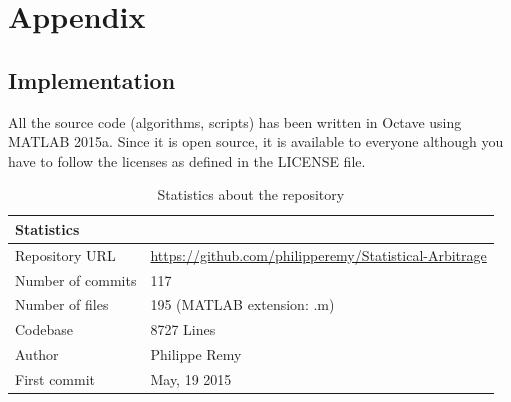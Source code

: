 \documentclass[11pt,a4,twosided,singlespacing,titlepagenumber=on]{scrreprt}
\numberwithin{equation}{chapter} %
\theoremstyle{remark}
\begin{document}

\cleardoublepage
{}
{} %




\chapter{Appendix}

\section{Implementation}
\label{app:implementation}
All the source code (algorithms, scripts) has been written in Octave using MATLAB 2015a. Since it is open source, it is available to everyone although you have to follow the licenses as defined in the LICENSE file.

\begin{table}[H]
\centering
\begin{tabular}{ll}
\hline
\multicolumn{1}{|l}{Statistics}     & \multicolumn{1}{l|}{} \\ \hline
Repository URL 					   &  \url{https://github.com/philipperemy/Statistical-Arbitrage} \\
Number of commits   			 &  117 \\
Number of files   				 &  195 (MATLAB extension: .m) \\
Codebase   				         &  8727 Lines\\
Author          &  Philippe Remy \\
First commit & May, 19 2015 \\
\hline
\end{tabular}
\caption{Statistics about the repository}
\label{Statistics_repository}
\end{table}
\end{document}
